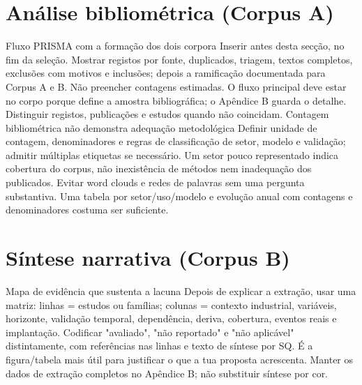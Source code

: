 \section{Análise bibliométrica (Corpus A)}
\label{sec:corpus-a}
{Fluxo PRISMA com a formação dos dois corpora}
{Inserir antes desta secção, no fim da seleção. Mostrar registos por
fonte, duplicados, triagem, textos completos, exclusões com motivos e
inclusões; depois a ramificação documentada para Corpus A e B.
Não preencher contagens estimadas. O fluxo principal deve estar no corpo
porque define a amostra bibliográfica; o Apêndice B guarda o detalhe.
Distinguir registos, publicações e estudos quando não coincidam.}%
{Contagem bibliométrica não demonstra adequação metodológica}
{Definir unidade de contagem, denominadores e regras de classificação de
setor, modelo e validação; admitir múltiplas etiquetas se necessário.
Um setor pouco representado indica cobertura do corpus, não inexistência
de métodos nem inadequação dos publicados. Evitar word clouds e redes
de palavras sem uma pergunta substantiva. Uma tabela por setor/uso/modelo
e evolução anual com contagens e denominadores costuma ser suficiente.}%



\section{Síntese narrativa (Corpus B)}
\label{sec:corpus-b}
{Mapa de evidência que sustenta a lacuna}
{Depois de explicar a extração, usar uma matriz: linhas = estudos ou
famílias; colunas = contexto industrial, variáveis, horizonte, validação
temporal, dependência, deriva, cobertura, eventos reais e implantação.
Codificar "avaliado", "não reportado" e "não aplicável" distintamente,
com referências nas linhas e texto de síntese por SQ. É a figura/tabela
mais útil para justificar o que a tua proposta acrescenta. Manter os
dados de extração completos no Apêndice B; não substituir síntese por cor.}%




